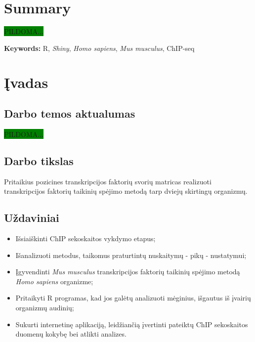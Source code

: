 \documentclass[12pt]{article}
\begin{document}
\section*{Summary}
\colorbox{green}{PILDOMA...}

\hfill \break
\textbf{Keywords:} R, \emph{Shiny}, \emph{Homo sapiens},
\emph{Mus musculus}, ChIP-seq

\newpage


\section{Įvadas}
\subsection*{Darbo temos aktualumas}
\colorbox{green}{PILDOMA...}

\subsection*{Darbo tikslas}
Pritaikius pozicines transkripcijos faktorių svorių matricas realizuoti
transkripcijos faktorių taikinių spėjimo metodą tarp dviejų skirtingų organizmų.

\subsection*{Uždaviniai}
\begin{itemize}
    \item Išsiaiškinti ChIP sekoskaitos vykdymo etapus;
    \item Išanalizuoti metodus, taikomus praturtintų nuskaitymų - pikų -
          nustatymui;
    \item Įgyvendinti \emph{Mus musculus} transkripcijos faktorių taikinių
          spėjimo metodą \emph{Homo sapiens} organizme;
    \item Pritaikyti R programas, kad jos galėtų analizuoti mėginius, išgautus
          iš įvairių organizmų audinių;          
    \item Sukurti internetinę aplikaciją, leidžiančią įvertinti pateiktų
          ChIP sekoskaitos duomenų kokybę bei atlikti analizes.

\end{itemize}

\newpage

\end{document}
